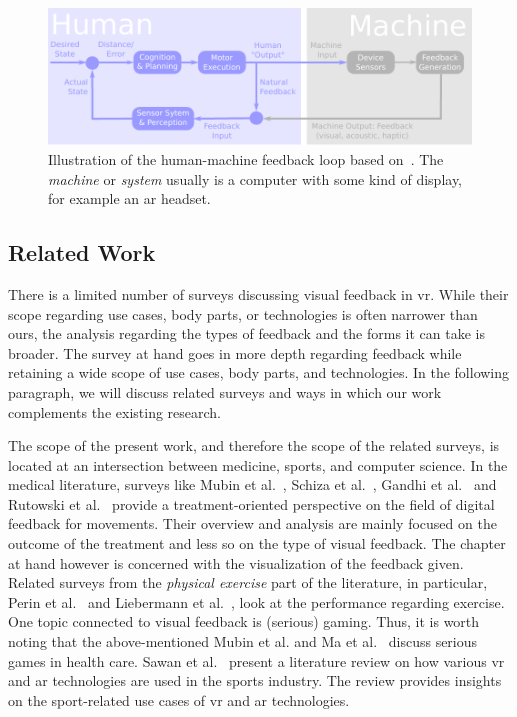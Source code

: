 \begin{figure}[tb]
    \centering
    \includegraphics[width=1\linewidth]{pictures/feedbackloop.pdf}
    \caption[Illustration of the human-machine feedback loop based on~\cite{morone2021dab}\label{fig:feedback}.]{Illustration of the human-machine feedback loop based on~\cite{morone2021dab}\label{fig:feedback}. The \emph{machine} or \emph{system} usually is a computer with some kind of display, for example an \acrshort{ar} headset.}
\end{figure}

\subsection{Related Work\label{sec:relatedwork}}
There is a limited number of surveys discussing visual feedback in \acrshort{vr}. While their scope regarding use cases, body parts, or technologies is often narrower than ours, the analysis regarding the types of feedback and the forms it can take is broader. The survey at hand goes in more depth regarding feedback while retaining a wide scope of use cases, body parts, and technologies. In the following paragraph, we will discuss related surveys and ways in which our work complements the existing research.

The scope of the present work, and therefore the scope of the related surveys, is located at an intersection between medicine, sports, and computer science. In the medical literature, surveys like Mubin et al.~\cite{mubin2020esg}, Schiza et al.~\cite{schiza2019vra}, Gandhi et al.~\cite{gandhi2020mts} and Rutowski et al.~\cite{rutkowski2020uvr} provide a treatment-oriented perspective on the field of digital feedback for movements. Their overview and analysis are mainly focused on the outcome of the treatment and less so on the type of visual feedback. The chapter at hand however is concerned with the visualization of the feedback given. Related surveys from the \emph{physical exercise} part of the literature, in particular, Perin et al.~\cite{perin2018sas} and Liebermann et al.~\cite{liebermann2002aai}, look at the performance regarding exercise.
One topic connected to visual feedback is (serious) gaming. Thus, it is worth noting that the above-mentioned Mubin et al. \cite{mubin2020esg} and Ma et al.~\cite{ma2011vrp} discuss serious games in health care. Sawan et al.~\cite{Sawan2016MRS} present a literature review on how various \acrshort{vr} and \acrshort{ar} technologies are used in the sports industry. The review provides insights on the sport-related use cases of \acrshort{vr} and \acrshort{ar} technologies.

